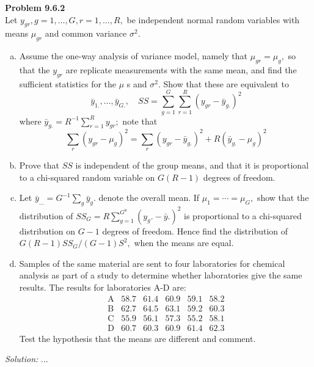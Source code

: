 \documentclass[a4paper, 11pt]{article}
\newenvironment{problem}[2][Problem]
    { \begin{mdframed}[backgroundcolor=gray!20] \textbf{#1 #2} \\}
    {  \end{mdframed}}
\newenvironment{solution}
    {\textit{Solution:}}
    {}
\begin{document}
\begin{problem}{9.6.2}
  Let $y_{g r}, g=1, \ldots, G, r=1, \ldots, R,$ be independent normal random variables with means $\mu_{g r}$ and common variance $\sigma^{2}$.
  \begin{enumerate}[(a)]
    \item  Assume the one-way analysis of variance model, namely that $\mu_{g r}=\mu_{g},$ so that the $y_{g r}$ are replicate measurements with the same mean, and find the sufficient statistics for the $\mu$ s and $\sigma^{2}$. Show that these are equivalent to
    $$
    \bar{y}_{1 .}, \ldots, \bar{y}_{G .}, \quad S S=\sum_{g=1}^{G} \sum_{r=1}^{R}\left(y_{g r}-\bar{y}_{g .}\right)^{2}
    $$
    where $\bar{y}_{g .}=R^{-1} \sum_{r=1}^{R} y_{g r} ;$ note that
    $$
    \sum_{r}\left(y_{g r}-\mu_{g}\right)^{2}=\sum_{r}\left(y_{g r}-\bar{y}_{g .}\right)^{2}+R\left(\bar{y}_{g .}-\mu_{g}\right)^{2}
    $$

    \item Prove that $S S$ is independent of the group means, and that it is proportional to a chi-squared random variable on $G(R-1)$ degrees of freedom.

    \item Let $\bar{y}_{\dots}=G^{-1} \sum_{g} \bar{y}_{g}$. denote the overall mean. If $\mu_{1}=\cdots=\mu_{G},$ show that the distribution of $S S_{G}=R \sum_{g=1}^{G^{8}}\left(y_{g} .-\bar{y} .\right)^{2}$ is proportional to a chi-squared distribution on $G-1$
    degrees of freedom. Hence find the distribution of $G(R-1) S S_{G} /(G-1) S^{2},$ when the means are equal.

    \item Samples of the same material are sent to four laboratories for chemical analysis as part of a study to determine whether laboratories give the same results. The results for laboratories A-D are:
    $$\begin{array}{llllll}
    \mathrm{A} & 58.7 & 61.4 & 60.9 & 59.1 & 58.2 \\
    \mathrm{B} & 62.7 & 64.5 & 63.1 & 59.2 & 60.3 \\
    \mathrm{C} & 55.9 & 56.1 & 57.3 & 55.2 & 58.1 \\
    \mathrm{D} & 60.7 & 60.3 & 60.9 & 61.4 & 62.3
    \end{array}$$
    Test the hypothesis that the means are different and comment.

  \end{enumerate}

\end{problem}
\begin{solution}
...
\end{solution}
\end{document}
